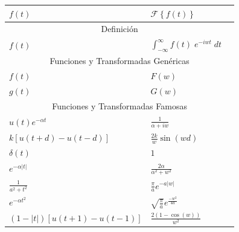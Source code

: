 \documentclass[12pt, fleqn]{report}                             %
\newcommand{\Wrap}[1]{\left( #1 \right)}                        %
\newcommand{\Cos}[1]{\cos\Wrap{#1}}                             %
\newcommand{\Sin}[1]{\sin\Wrap{#1}}                             %
\newcommand{\FourierT}[1]{\mathscr{F} \left\{ #1 \right\} }     %
\begin{document}
            \begin{table}[ht]
                \begin{tabular}{|m{16em}|m{16em}|@{}m{0pt}@{}}
                    \hline
                    \large{$f(t)$}          & \large{$\FourierT{f(t)}$}                 &\\[2em]      \hline\hline

                    \multicolumn{3}{|c|}{Definición}                                     \\           \hline
                    $f(t)$ &        $\int_{-\infty}^\infty f(t) \; e^{-iwt} \; dt$      &\\[1em]      \hline\hline
                    
                    \multicolumn{3}{|c|}{Funciones y Transformadas Genéricas}           \\            \hline
                    $f(t)$                  & $F(w)$                                    &\\[1em]      \hline
                    $g(t)$                  & $G(w)$                                    &\\[1em]      \hline\hline

                    \multicolumn{3}{|c|}{Funciones y Transformadas Famosas}             \\            \hline
                    $u(t)e^{-\alpha t}$     & $\frac{1}{\alpha + iw}                    $ &\\[1em]    \hline
                    $k[u(t+d) -u(t-d)]$     & $\frac{2k}{w} \Sin{wd}                    $ &\\[1em]    \hline
                    $\delta(t)        $     & $1                                        $ &\\[1em]    \hline
                    $e^{-\alpha|t|}   $     & $\frac{2\alpha}{\alpha^2+w^2}             $ &\\[1em]    \hline
                    $\frac{1}{a^2+t^2}$     & $\frac{\pi}{a} e^{-a |w|}                 $ &\\[1em]    \hline
                    $e^{-\alpha t^2}  $     & $\sqrt{\frac{\pi}{a}} e^{\frac{-w^2}{4a}} $ &\\[1em]    \hline
                    $(1-|t|)[u(t+1)-u(t-1)]$& $\frac{2(1 - \Cos{w})}{w^2}               $ &\\[1em]    \hline\hline
                    

\end{tabular}
\end{table}
\end{document}
